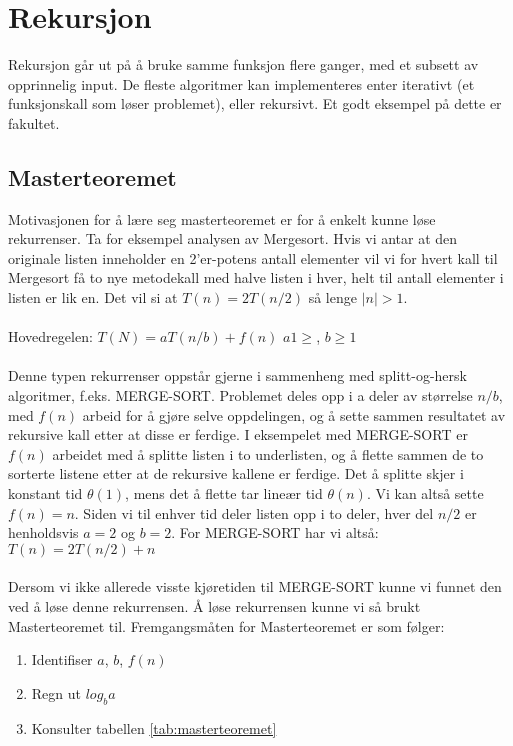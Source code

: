 \section{Rekursjon}
Rekursjon går ut på å bruke samme funksjon flere ganger, med et subsett av opprinnelig input. De fleste algoritmer kan implementeres enter iterativt (et funksjonskall som løser problemet), eller rekursivt. Et godt eksempel på dette er fakultet. 

\subsection{Masterteoremet}
Motivasjonen for å lære seg masterteoremet er for å enkelt kunne løse rekurrenser. Ta for eksempel analysen av Mergesort. Hvis vi antar at den originale listen inneholder en 2’er-potens antall elementer vil vi for hvert kall til Mergesort få to nye metodekall med halve listen i hver, helt til antall elementer i listen er lik en. Det vil si at $T(n) = 2T(n/2)$ så lenge $|n| > 1$. 
\\\\
Hovedregelen: $T(N) = aT(n/b) + f(n)$   $a1\geq$, $b \geq 1$
\\\\
Denne typen rekurrenser oppstår gjerne i sammenheng med splitt-og-hersk algoritmer, f.eks. MERGE-SORT. Problemet deles opp i a deler av størrelse $n/b$, med $f(n)$ arbeid for å gjøre selve oppdelingen, og å sette sammen resultatet av rekursive kall etter at disse er ferdige. I eksempelet med MERGE-SORT er $f(n)$ arbeidet med å splitte listen i to underlisten, og å flette sammen de to sorterte listene etter at de rekursive kallene er ferdige. Det å splitte skjer i konstant tid $\theta(1)$, mens det å flette tar lineær tid $\theta(n)$. Vi kan altså sette $f(n) = n$. Siden vi til enhver tid deler listen opp i to deler, hver del $n/2$ er henholdsvis $a = 2$ og $b = 2$. For MERGE-SORT har vi altså: $T(n) = 2T(n/2) + n$
\\\\
Dersom vi ikke allerede visste kjøretiden til MERGE-SORT kunne vi funnet den ved å løse denne rekurrensen. Å løse rekurrensen kunne vi så brukt Masterteoremet til. Fremgangsmåten for Masterteoremet er som følger:
\begin{enumerate}
    \item Identifiser $a$, $b$, $f(n)$
    \item Regn ut $log_b a$
    \item Konsulter tabellen \ref{tab:masterteoremet}
\end{enumerate}

